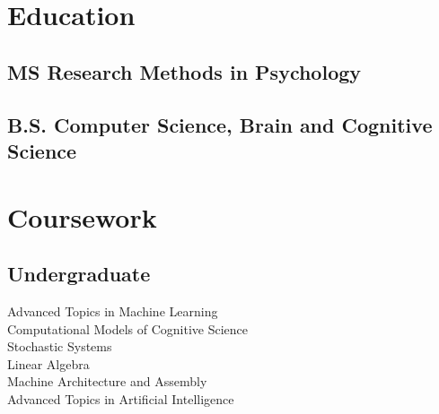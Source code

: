 \documentclass[]{csaund_resume-openfont}
\begin{document}
%
%

%
%

%
%

\begin{minipage}[t]{0.30\textwidth}


\section{Education}

\subsection{MS Research Methods in Psychology}
\sectionsep

\subsection{B.S. Computer Science, Brain and Cognitive Science}
\sectionsep




\section{Coursework}
\subsection{Undergraduate}
Advanced Topics in Machine Learning \\
Computational Models of Cognitive Science \\
Stochastic Systems \\
Linear Algebra \\
Machine Architecture and Assembly \\
Advanced Topics in Artificial Intelligence \\
\sectionsep


\end{minipage}
\end{document}
